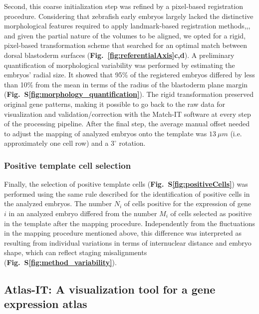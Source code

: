 Second, this coarse initialization step was refined by a pixel-based registration procedure. Considering that zebrafish early embryos largely lacked the distinctive morphological features required to apply landmark-based registration methods\cite{tomer2010profiling},\cite{peng2011brainaligner},\cite{egger20123d}, and given the partial nature of the volumes to be aligned, we opted for a rigid, pixel-based transformation scheme\cite{castro2009automatic} that searched for an optimal match between dorsal blastoderm surfaces (\textbf{Fig.~\ref{fig:referentialAxis}c,d}). A preliminary quantification of morphological variability was performed by estimating the embryos' radial size. It showed that 95\% of the registered embryos differed by less than 10\% from the mean in terms of the radius of the blastoderm plane margin (\textbf{Fig.~S\ref{fig:morphology_quantification}}). The rigid transformation preserved original gene patterns, making it possible to go back to the raw data for visualization and validation/correction with the Match-IT software at every step of the processing pipeline. After the final step, the average manual offset needed to adjust the mapping of analyzed embryos onto the template was $13~\mu m$ (i.e. approximately one cell row) and a $3^\circ$ rotation.



\subsubsection*{Positive template cell selection}



Finally, the selection of positive template cells (\textbf{Fig.~S\ref{fig:positiveCells}}) was performed using the same rule described for the identification of positive cells in the analyzed embryos. The number $N_i$ of cells positive for the expression of gene $i$ in an analyzed embryo differed from the number $M_i$ of cells selected as positive in the template after the mapping procedure. Independently from the fluctuations in the mapping procedure mentioned above, this difference was interpreted as resulting from individual variations in terms of internuclear distance and embryo shape, which can reflect staging misalignments (\textbf{Fig.~S\ref{fig:method_variability}}).



\subsection*{Atlas-IT: A visualization tool for a gene expression atlas}



